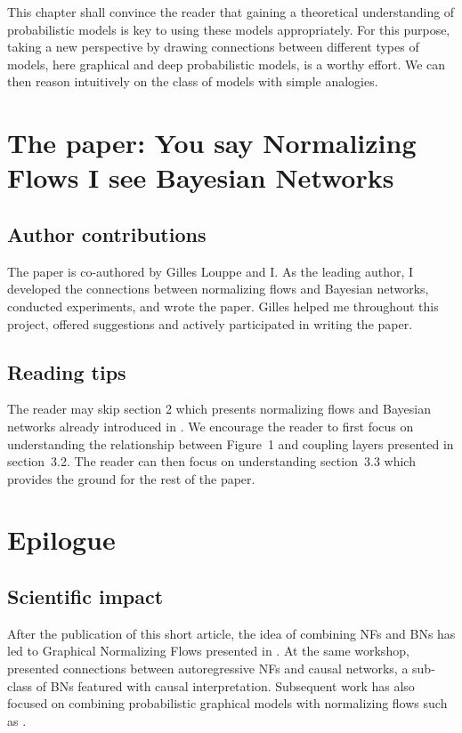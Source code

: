 This chapter shall convince the reader that gaining a theoretical understanding of probabilistic models is key to using these models appropriately. For this purpose, taking a new perspective by drawing connections between different types of models, here graphical and deep probabilistic models, is a worthy effort. We can then reason intuitively on the class of models with simple analogies.

\vfill

\section{The paper: You say Normalizing Flows I see Bayesian Networks}

\subsection{Author contributions}
The paper is co-authored by Gilles Louppe and I. As the leading author, I developed the connections between normalizing flows and Bayesian networks, conducted experiments, and wrote the paper. Gilles helped me throughout this project, offered suggestions and actively participated in writing the paper.

\subsection{Reading tips}
The reader may skip section 2 which presents normalizing flows and Bayesian networks already introduced in . We encourage the reader to first focus on understanding the relationship between Figure~1 and coupling layers presented in section~3.2. The reader can then focus on understanding section~3.3 which provides the ground for the rest of the paper.


\section{Epilogue}
\subsection{Scientific impact}
After the publication of this short article, the idea of combining NFs and BNs has led to Graphical Normalizing Flows presented in . At the same workshop, \citet{khemakhem_causal_2020} presented connections between autoregressive NFs and causal networks, a sub-class of BNs featured with causal interpretation. Subsequent work has also focused on combining probabilistic graphical models with normalizing flows such as \citet{mouton2022graphical, mouton2022siren}.

